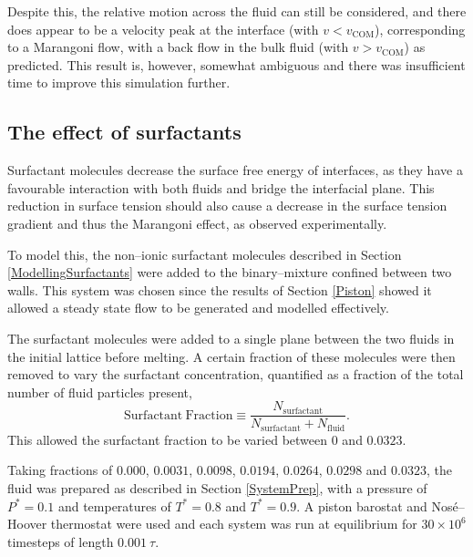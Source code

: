 Despite this, the relative motion across the fluid can still be considered, and there does appear to be a velocity peak at the interface (with $v < v_{\mathrm{COM}}$), corresponding to a Marangoni flow, with a back flow in the bulk fluid (with $v > v_{\mathrm{COM}}$) as predicted.
This result is, however, somewhat ambiguous and there was insufficient time to improve this simulation further.

\subsection{The effect of surfactants}\label{SurfResult}
Surfactant molecules decrease the surface free energy of interfaces, as they have a favourable interaction with both fluids and bridge the interfacial plane.
This reduction in surface tension should also cause a decrease in the surface tension gradient and thus the Marangoni effect, as observed experimentally.\cite{KimSubramanianA,KimSubramanianB,BartonSubramanian,ChenStebe}

To model this, the non--ionic surfactant molecules described in Section \ref{ModellingSurfactants} were added to the binary--mixture confined between two walls.
This system was chosen since the results of Section \ref{Piston} showed it allowed a steady state flow to be generated and modelled effectively.

The surfactant molecules were added to a single plane between the two fluids in the initial lattice before melting.
A certain fraction of these molecules were then removed to vary the surfactant concentration, quantified as a fraction of the total number of fluid particles present,
\begin{equation}
\mathrm{Surfactant\ Fraction} \equiv \frac{N_{\mathrm{surfactant}}}{N_{\mathrm{surfactant}}+N_{\mathrm{fluid}}}.
\end{equation}
This allowed the surfactant fraction to be varied between $0$ and $0.0323$.

Taking fractions of $0.000$, $0.0031$, $0.0098$, $0.0194$, $0.0264$, $0.0298$ and $0.0323$, the fluid was prepared as described in Section \ref{SystemPrep}, with a pressure of $P^{*}=0.1$ and temperatures of $T^{*}=0.8$ and $T^{*}=0.9$.
A piston barostat and Nos\'{e}--Hoover thermostat were used and each system was run at equilibrium for $30 \times 10^{6}$ timesteps of length $0.001\ \tau$.

